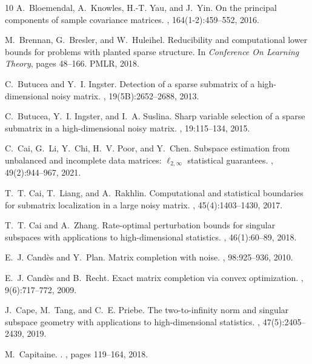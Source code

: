 \documentclass[reqno]{amsart}
\theoremstyle{plain}
\theoremstyle{definition}
\begin{document}
\begin{thebibliography}{10}
A.~Bloemendal, A.~Knowles, H.-T. Yau, and J.~Yin.
\newblock On the principal components of sample covariance matrices.
, 164(1-2):459--552, 2016.

M.~Brennan, G.~Bresler, and W.~Huleihel.
\newblock Reducibility and computational lower bounds for problems with planted
  sparse structure.
\newblock In {\em Conference On Learning Theory}, pages 48--166. PMLR, 2018.

C.~Butucea and Y.~I. Ingster.
\newblock Detection of a sparse submatrix of a high-dimensional noisy matrix.
, 19(5B):2652--2688, 2013.

C.~Butucea, Y.~I. Ingster, and I.~A. Suslina.
\newblock Sharp variable selection of a sparse submatrix in a high-dimensional
  noisy matrix.
, 19:115--134, 2015.

C.~Cai, G.~Li, Y.~Chi, H.~V. Poor, and Y.~Chen.
\newblock Subspace estimation from unbalanced and incomplete data matrices:
  $\ell_{2,\infty}$ statistical guarantees.
, 49(2):944--967, 2021.

T.~T. Cai, T.~Liang, and A.~Rakhlin.
\newblock Computational and statistical boundaries for submatrix localization
  in a large noisy matrix.
, 45(4):1403--1430, 2017.

T.~T. Cai and A.~Zhang.
\newblock Rate-optimal perturbation bounds for singular subspaces with
  applications to high-dimensional statistics.
, 46(1):60--89, 2018.

E.~J. Cand{\`e}s and Y.~Plan.
\newblock Matrix completion with noise.
, 98:925--936, 2010.

E.~J. Cand\`es and B.~Recht.
\newblock Exact matrix completion via convex optimization.
, 9(6):717--772, 2009.

J.~Cape, M.~Tang, and C.~E. Priebe.
\newblock The two-to-infinity norm and singular subspace geometry with
  applications to high-dimensional statistics.
, 47(5):2405--2439, 2019.

M.~{Capitaine}.
.
, pages 119--164, 2018.


\end{thebibliography}
\end{document}
